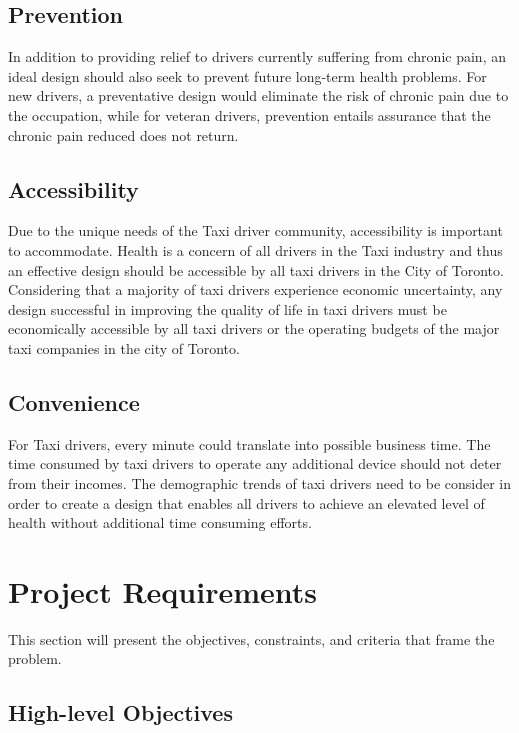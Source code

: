 \documentclass[11pt]{article}
\begin{document}
\subsection{Prevention}
In addition to providing relief to drivers currently suffering from 
chronic pain, an ideal design should also seek to prevent future long-term 
health problems. For new drivers, a preventative design would eliminate
the risk of chronic pain due to the occupation, while for veteran 
drivers, prevention entails assurance that the chronic pain reduced does
not return. 
 
\subsection{Accessibility}
Due to the unique needs of the Taxi driver community, accessibility is 
important to accommodate. Health is a concern of all drivers in the Taxi 
industry and thus an effective design should be accessible by all taxi 
drivers in the City of Toronto. Considering that a majority of taxi 
drivers experience economic uncertainty\cite{facey2003health}, any design 
successful in improving the quality of life in taxi drivers must be
economically accessible by all taxi drivers or the operating 
budgets of the major taxi companies in the city of Toronto. 
 
\subsection{Convenience}
For Taxi drivers, every minute could translate into possible business 
time\cite{ facey2003health}. The time consumed by taxi drivers to operate 
any additional device should not deter from their incomes. The demographic 
trends of taxi drivers need to be consider in order to create a design 
that enables all drivers to achieve an elevated level of health 
without additional time consuming efforts.

\section{Project Requirements}
\label{sec:requirements}
This section will present the objectives, constraints, and criteria 
that frame the problem.

\subsection{High-level Objectives}
\label{sec:high-level-objectives}
\end{document}
